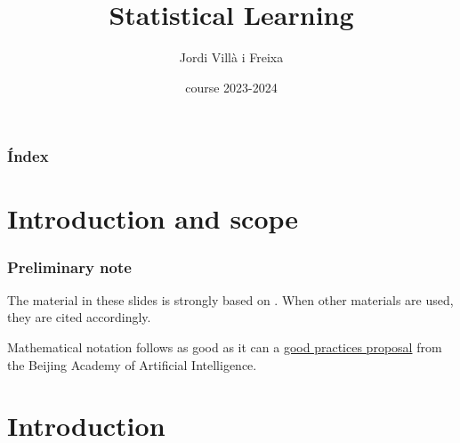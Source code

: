 \documentclass{beamer}
\title[Sttatistical Learning]{Statistical Learning} %
\author{Jordi Villà i Freixa} %
\institute[FCTE] %
{
Universitat de Vic - Universitat Central de Catalunya \\
Study Abroad\\ %
\medskip
\textit{jordi.villa@uvic.cat} %
}
\date{course 2023-2024}
\begin{document}
\begin{frame}
\titlepage %
\end{frame}

\begin{frame}
\frametitle{Índex} %
\tableofcontents %
\end{frame}

\section{Introduction and scope}
\begin{frame}
  \frametitle{Preliminary note}
  The material in these slides is strongly based on \cite{kroese2020}. When other materials are used, they are cited accordingly.

  Mathematical notation follows as good as it can a \href{https://ctan.math.utah.edu/ctan/tex-archive/macros/latex/contrib/mlmath/mlmath.pdf}{good practices proposal} from the Beijing Academy of Artificial Intelligence.
  \end{frame}

\section{Introduction} %

\end{document}

